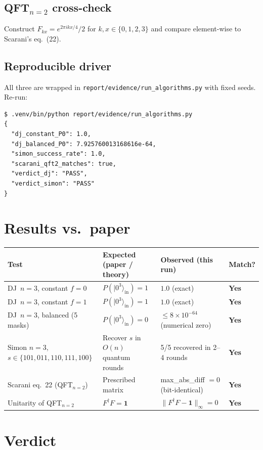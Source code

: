 \documentclass[11pt]{article}
\begin{document}
\subsection{QFT$_{n=2}$ cross-check}
Construct $F_{kx} = e^{2\pi i k x / 4} / 2$ for $k,x\in\{0,1,2,3\}$ and compare element-wise to Scarani's eq.~(22).

\subsection{Reproducible driver}
All three are wrapped in \verb|report/evidence/run_algorithms.py| with fixed seeds.
Re-run:
\begin{lstlisting}
$ .venv/bin/python report/evidence/run_algorithms.py
{
  "dj_constant_P0": 1.0,
  "dj_balanced_P0": 7.925760013168616e-64,
  "simon_success_rate": 1.0,
  "scarani_qft2_matches": true,
  "verdict_dj": "PASS",
  "verdict_simon": "PASS"
}
\end{lstlisting}

\section{Results vs.\ paper}

\begin{tabular}{p{5.2cm}lll}
\toprule
Test & Expected (paper / theory) & Observed (this run) & Match?\\
\midrule
DJ~$n{=}3$, constant $f{=}0$ & $P(|0^3\rangle_{\text{in}})=1$ & $1.0$ (exact) & \textbf{Yes} \\
DJ~$n{=}3$, constant $f{=}1$ & $P(|0^3\rangle_{\text{in}})=1$ & $1.0$ (exact) & \textbf{Yes} \\
DJ~$n{=}3$, balanced (5 masks) & $P(|0^3\rangle_{\text{in}})=0$ & $\le 8\!\times\!10^{-64}$ (numerical zero) & \textbf{Yes} \\
Simon $n{=}3$, $s\in\{101,011,110,111,100\}$ & Recover $s$ in $O(n)$ quantum rounds & 5/5 recovered in 2--4 rounds & \textbf{Yes} \\
Scarani eq.\ 22 (QFT$_{n=2}$) & Prescribed matrix & max\_abs\_diff $=0$ (bit-identical) & \textbf{Yes} \\
Unitarity of QFT$_{n=2}$ & $F^\dagger F = \mathbf{1}$ & $\|F^\dagger F - \mathbf{1}\|_\infty = 0$ & \textbf{Yes} \\
\bottomrule
\end{tabular}

\section{Verdict}
\end{document}
